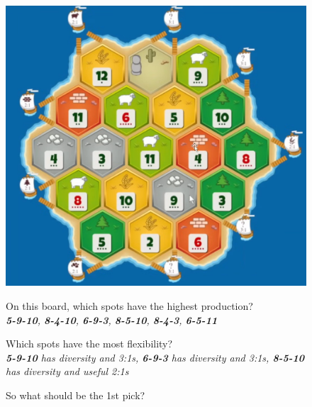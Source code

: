 \documentclass[12pt]{article}
\begin{document}
\vspace{-0.5cm}
\begin{figure}[h]
    \begin{minipage}{0.45\textwidth}
        \centering
        \includegraphics[width=\textwidth]{../imgs/example_board_1.png}
        \label{fig:example_board_1}
    \end{minipage}
    \hfill
    \begin{minipage}{0.5\textwidth}
        \raggedright
            On this board, which spots have the highest production? \\
            \textit{\textbf{5-9-10}, \textbf{8-4-10}, \textbf{6-9-3}, \textbf{8-5-10}, \textbf{8-4-3}, \textbf{6-5-11}} \\
            \vspace{0.5cm}

            Which spots have the most flexibility? \\
            \textit{\textbf{5-9-10} has diversity and 3:1s,
            \textbf{6-9-3} has diversity and 3:1s,
            \textbf{8-5-10} has diversity and useful 2:1s} \\
            \vspace{0.5cm}

            So what should be the 1st pick?
            \vspace{0.5cm}
    \end{minipage}
\end{figure}
\end{document}
